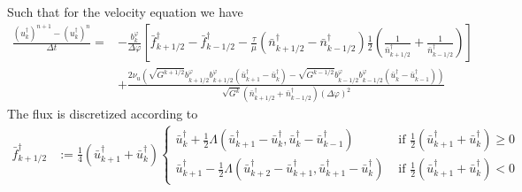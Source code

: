 Such that for the velocity equation we have
\begin{align}
    \frac{(u_k^\dagger)^{n+1}-(u_k^\dagger)^{n}}{\Delta t} = &- \frac{b^\varphi_k}{\Delta
    \varphi} \left[ \bar f^\dagger_{k+1/2} -\bar f^\dagger_{k-1/2} -
        \frac{\tau}{\mu} \left(\bar n^\dagger_{k+1/2} - \bar n^\dagger_{k-1/2}\right) \frac{1}{2}\left(\frac{1}{\bar n^\dagger_{k+1/2}}
    +\frac{1}{\bar n^\dagger_{k-1/2}}\right)\right]
    \nonumber\\
    &+ \frac{2\nu_u
        \left(\sqrt{G^{k+1/2}}b^\varphi_{k+1/2}b^\varphi_{k+1/2} (\bar u^\dagger_{k+1} - \bar u^\dagger_k)
        - \sqrt{G^{k-1/2}}b^\varphi_{k-1/2}b^\varphi_{k-1/2} (\bar u^\dagger_k - \bar u^\dagger_{k-1})\right)
    }{\sqrt{G^k}(\bar n^\dagger_{k+1/2} + \bar n^\dagger_{k-1/2}) (\Delta \varphi)^2}
\end{align}
The flux is discretized according to
\begin{align}
    \bar f^\dagger_{k+1/2} &:= \frac{1}{4}(\bar u^\dagger_{k+1}+\bar u^\dagger_k)
    \begin{cases}
        \bar u^\dagger_{k} + \frac{1}{2}\Lambda\left( \bar u^\dagger_{k+1} - \bar u^\dagger_k, \bar u^\dagger_k - \bar u^\dagger_{k-1}\right)&
        \text{ if } \frac{1}{2}(\bar u^\dagger_{k+1}+\bar u^\dagger_k) \geq 0 \\
        \bar u^\dagger_{k+1}   - \frac{1}{2}\Lambda\left( \bar u^\dagger_{k+2} - \bar u^\dagger_{k+1}, \bar u^\dagger_{k+1} -\bar u^\dagger_k \right) &
        \text{ if } \frac{1}{2}(\bar u^\dagger_{k+1}+\bar u^\dagger_k) < 0
    \end{cases}
\end{align}


